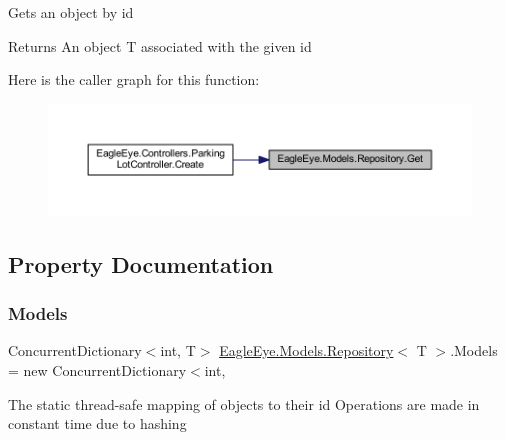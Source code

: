 Gets an object by id 

\begin{DoxyReturn}{Returns}
An object T associated with the given id 
\end{DoxyReturn}
Here is the caller graph for this function\+:\nopagebreak
\begin{figure}[H]
\begin{center}
\leavevmode
\includegraphics[width=350pt]{class_eagle_eye_1_1_models_1_1_repository_ac44cb18d8cbb605d3f7e14eb09c8c0bf_icgraph}
\end{center}
\end{figure}


\subsection{Property Documentation}
\mbox{\label{class_eagle_eye_1_1_models_1_1_repository_a26d864f26d5b20030d5c7c3e9400954a}} 
\subsubsection{\texorpdfstring{Models}{Models}}
{\footnotesize\ttfamily Concurrent\+Dictionary$<$int, T$>$ \mbox{\hyperlink{class_eagle_eye_1_1_models_1_1_repository}{Eagle\+Eye.\+Models.\+Repository}}$<$ T $>$.Models = new Concurrent\+Dictionary$<$int\hspace{0.3cm}{\ttfamily [static]}, {\ttfamily [get]}}



The static thread-\/safe mapping of objects to their id Operations are made in constant time due to hashing 

\mbox{\label{class_eagle_eye_1_1_models_1_1_repository_a799dfc419bb17912528a53eff82f50ff}} 
